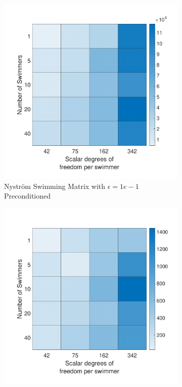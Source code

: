 \begin{figure}
\ContinuedFloat
    \begin{subfigure}{0.3\textwidth}
        \includegraphics[width=\linewidth]{Images/Condition/Mobility Matrix Preconditioned-1.pdf}
        \caption{Nyström Swimming Matrix with $\epsilon=1e-1$ Preconditioned}
    \end{subfigure}
    \begin{subfigure}{0.3\textwidth}
        \includegraphics[width=\linewidth]{Images/Condition/Mobility Matrix Preconditioned-2.pdf}

\end{subfigure}
\end{figure}
